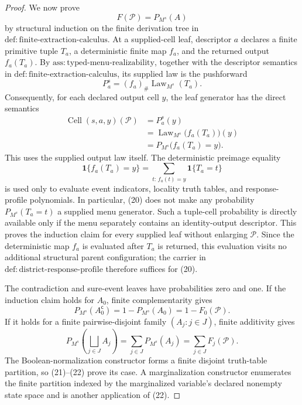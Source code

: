 \documentclass{article}
\begin{document}
\begin{proof}
We now prove
\[
 F(\mathcal P)=P_{M^s}(A)
\tag{17}
\]
by structural induction on the finite derivation tree in \(\mathrm{def:finite\text{-}extraction\text{-}calculus}\). At a supplied-cell leaf, descriptor \(a\) declares a finite primitive tuple \(T_a\), a deterministic finite map \(f_a\), and the returned output \(f_a(T_a)\). By \(\mathrm{ass:typed\text{-}menu\text{-}realizability}\), together with the descriptor semantics in \(\mathrm{def:finite\text{-}extraction\text{-}calculus}\), its supplied law is the pushforward
\[
 P_a^s=(f_a)_\#\operatorname{Law}_{M^s}(T_a).
\tag{18}
\]
Consequently, for each declared output cell \(y\), the leaf generator has the direct semantics
\[
 \begin{aligned}
 \operatorname{Cell}(s,a,y)(\mathcal P)
 &=P_a^s(y)\\
 &=\operatorname{Law}_{M^s}\!\bigl(f_a(T_a)\bigr)(y)\\
 &=P_{M^s}\!\bigl(f_a(T_a)=y\bigr).
 \end{aligned}
\tag{19}
\]
This uses the supplied output law itself. The deterministic preimage equality
\[
 \mathbf 1\{f_a(T_a)=y\}
 =\sum_{t:\,f_a(t)=y}\mathbf 1\{T_a=t\}
\tag{20}
\]
is used only to evaluate event indicators, locality truth tables, and response-profile polynomials. In particular, (20) does not make any probability \(P_{M^s}(T_a=t)\) a supplied menu generator. Such a tuple-cell probability is directly available only if the menu separately contains an identity-output descriptor. This proves the induction claim for every supplied leaf without enlarging \(\mathcal P\). Since the deterministic map \(f_a\) is evaluated after \(T_a\) is returned, this evaluation visits no additional structural parent configuration; the carrier in \(\mathrm{def:district\text{-}response\text{-}profile}\) therefore suffices for (20).

The contradiction and sure-event leaves have probabilities zero and one. If the induction claim holds for \(A_0\), finite complementarity gives
\[
 P_{M^s}(A_0^{\mathsf c})
 =1-P_{M^s}(A_0)
 =1-F_0(\mathcal P).
\tag{21}
\]
If it holds for a finite pairwise-disjoint family \((A_j:j\in J)\), finite additivity gives
\[
 P_{M^s}\!\left(\bigsqcup_{j\in J}A_j\right)
 =\sum_{j\in J}P_{M^s}(A_j)
 =\sum_{j\in J}F_j(\mathcal P).
\tag{22}
\]
The Boolean-normalization constructor forms a finite disjoint truth-table partition, so (21)--(22) prove its case. A marginalization constructor enumerates the finite partition indexed by the marginalized variable's declared nonempty state space and is another application of (22).


\end{proof}
\end{document}

